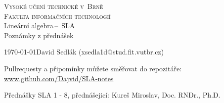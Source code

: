\documentclass[a4paper, 11pt]{article}
\theoremstyle{break}
\begin{document}
\begin{titlepage}

	\begin{center}
		\textsc{\Huge Vysoké učení technické v~Brně}\\
				  \huge{\textsc{Fakulta informačních technologií}}\\
		{\LARGE 	Lineární algebra\,--\, SLA}\\
				{\Huge Poznámky z přednášek}
	\end{center}
	{\Large\today \hfill David Sedlák (xsedla1d@stud.fit.vutbr.cz)}

	\begin{center}
		Pullrequesty a připomínky můžete směřovat do repozitáře: \url{www.github.com/Dajvid/SLA-notes}
	\end{center}
\end{titlepage}

\tableofcontents











\newpage


\def\refname{Reference}
Přednášky SLA 1 - 8, přednášejicí: Kureš Miroslav, Doc. RNDr., Ph.D.
\end{document}
